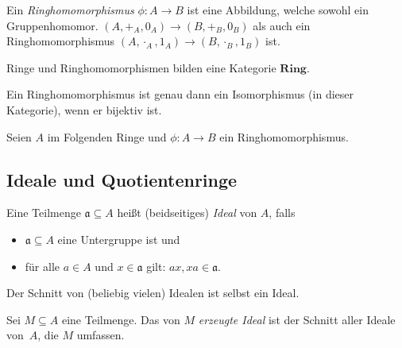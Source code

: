 \documentclass{cheat-sheet}
\newcommand{\Ring}{\mathbf{Ring}} %
\newcommand{\aaa}{\mathfrak{a}}
\begin{document}

\begin{defn}
  Ein \emph{Ringhomomorphismus} $\phi : A \to B$ ist eine Abbildung, welche sowohl ein Gruppenhomomor. $(A, +_A, 0_A) \to (B, +_B, 0_B)$ als auch ein Ringhomomorphismus $(A, \cdot_A, 1_A) \to (B, \cdot_B, 1_B)$ ist.
\end{defn}

\begin{bem}
  Ringe und Ringhomomorphismen bilden eine Kategorie $\Ring$.
\end{bem}

\begin{lem}
  Ein Ringhomomorphismus ist genau dann ein Isomorphismus (in dieser Kategorie), wenn er bijektiv ist.
\end{lem}

\begin{samepage}

\begin{konv}
  Seien $A$ im Folgenden Ringe und $\phi : A \to B$ ein Ringhomomorphismus.
\end{konv}

\subsection{Ideale und Quotientenringe}

\end{samepage}


\begin{defn}
  Eine Teilmenge $\aaa \subseteq A$ heißt (beidseitiges) \emph{Ideal} von $A$, falls
  \begin{itemize}
    \item $\aaa \subseteq A$ eine Untergruppe ist und
    \item für alle $a \in A$ und $x \in \aaa$ gilt: $ax, xa \in \aaa$.
  \end{itemize}
\end{defn}

\begin{lem}
  Der Schnitt von (beliebig vielen) Idealen ist selbst ein Ideal.
\end{lem}

\begin{defn}
  Sei $M \subseteq A$ eine Teilmenge.
  Das von $M$ \emph{erzeugte Ideal} ist der Schnitt aller Ideale von~$A$, die $M$ umfassen.
\end{defn}
\end{document}
